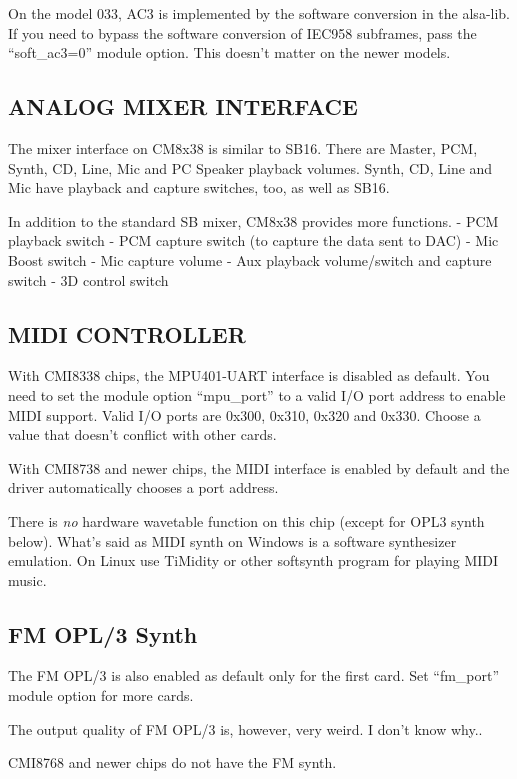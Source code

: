 \documentclass[a4paper,8pt,english]{sphinxmanual}
\begin{document}
On the model 033, AC3 is implemented by the software conversion in
the alsa-lib.  If you need to bypass the software conversion of IEC958
subframes, pass the ``soft\_ac3=0'' module option.  This doesn't matter
on the newer models.


\subsection{ANALOG MIXER INTERFACE}
\label{sound/cards/cmipci:analog-mixer-interface}
The mixer interface on CM8x38 is similar to SB16.
There are Master, PCM, Synth, CD, Line, Mic and PC Speaker playback
volumes.  Synth, CD, Line and Mic have playback and capture switches,
too, as well as SB16.

In addition to the standard SB mixer, CM8x38 provides more functions.
- PCM playback switch
- PCM capture switch (to capture the data sent to DAC)
- Mic Boost switch
- Mic capture volume
- Aux playback volume/switch and capture switch
- 3D control switch


\subsection{MIDI CONTROLLER}
\label{sound/cards/cmipci:midi-controller}
With CMI8338 chips, the MPU401-UART interface is disabled as default.
You need to set the module option ``mpu\_port'' to a valid I/O port address
to enable MIDI support.  Valid I/O ports are 0x300, 0x310, 0x320 and
0x330.  Choose a value that doesn't conflict with other cards.

With CMI8738 and newer chips, the MIDI interface is enabled by default
and the driver automatically chooses a port address.

There is \emph{no} hardware wavetable function on this chip (except for
OPL3 synth below).
What's said as MIDI synth on Windows is a software synthesizer
emulation.  On Linux use TiMidity or other softsynth program for
playing MIDI music.


\subsection{FM OPL/3 Synth}
\label{sound/cards/cmipci:fm-opl-3-synth}
The FM OPL/3 is also enabled as default only for the first card.
Set ``fm\_port'' module option for more cards.

The output quality of FM OPL/3 is, however, very weird.
I don't know why..

CMI8768 and newer chips do not have the FM synth.
\end{document}
